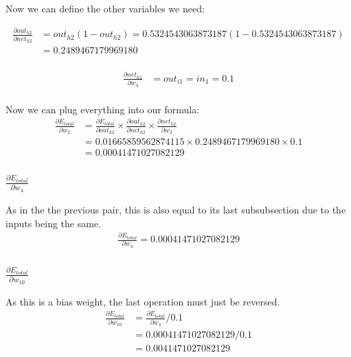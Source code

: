 \documentclass{article}
\begin{document}
Now we can define the other variables we need:

\begin{align*}
    \frac{\partial out_{h2}}{\partial net_{h2}} & =
    out_{h2}(1 - out_{h2}) = 0.5324543063873187(1 - 0.5324543063873187) \\
    & = 0.2489467179969180 \\ 
\end{align*}

\begin{align*}
    \frac{\partial net_{h1}}{\partial w_3} & = 
    out_{i1} = in_{1} = 0.1 \\
\end{align*}

Now we can plug everything into our formula:
\begin{align*} \frac{\partial E_{total}}{\partial w_2} & =
    \frac{\partial E_{total}}{\partial out_{h2}} \times
    \frac{\partial out_{h2}}{\partial net_{h2}} \times
    \frac{\partial net_{h2}}{\partial w_2} \\
    &= 0.01665859562874115 \times 0.2489467179969180 \times 0.1 \\
    &= 0.00041471027082129
\end{align*}
\subsubsection{$\frac{\partial E_{total}}{\partial w_4}$}
As in the the previous pair, this is also equal to its last subsubsection due to
the inputs being the same.
\begin{align*}
\frac{\partial E_{total}}{\partial w_4} = 0.00041471027082129
\end{align*}

\subsubsection{$\frac{\partial E_{total}}{\partial w_{10}}$}
As this is a bias weight, the last operation must just be reversed.
\begin{align*}
\frac{\partial E_{total}}{\partial w_{10}} & =
\frac{\partial E_{total}}{\partial w_4} / 0.1 \\
 & = 0.00041471027082129 / 0.1 \\
& = 0.0041471027082129
\end{align*}
\end{document}
